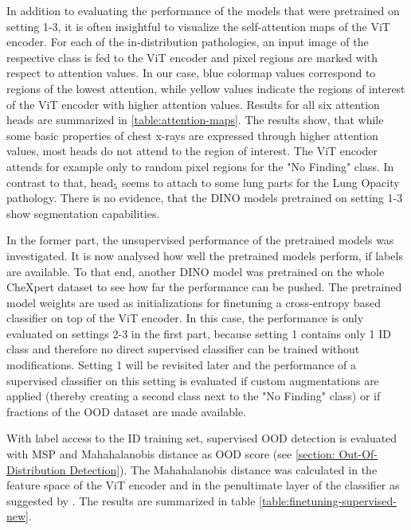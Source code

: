 \par
In addition to evaluating the performance of the models that were pretrained on setting 1-3, it is often insightful to visualize the self-attention maps of the ViT encoder.
For each of the in-distribution pathologies, an input image of the respective class is fed to the ViT encoder and pixel regions are marked with respect to attention values.
In our case, blue colormap values correspond to regions of the lowest attention, while yellow values indicate the regions of interest of the ViT encoder with higher attention values.
Results for all six attention heads are summarized in \ref{table:attention-maps}.
The results show, that while some basic properties of chest x-rays are expressed through higher attention values, most heads do not attend to the region of interest.
The ViT encoder attends for example only to random pixel regions for the "No Finding" class.
In contrast to that, $\text{head}_5$ seems to attach to some lung parts for the Lung Opacity pathology.
There is no evidence, that the DINO models pretrained on setting 1-3 show segmentation capabilities.
\par
In the former part, the unsupervised performance of the pretrained models was investigated.
It is now analysed how well the pretrained models perform, if labels are available.
To that end, another DINO model was pretrained on the whole CheXpert dataset to see how far the performance can be pushed.
The pretrained model weights are used as initializations for finetuning a cross-entropy based classifier on top of the ViT encoder.
In this case, the performance is only evaluated on settings 2-3 in the first part, because setting 1 contains only 1 ID class and therefore no direct supervised classifier can be trained without modifications.
Setting 1 will be revisited later and the performance of a supervised classifier on this setting is evaluated if custom augmentations are applied (thereby creating a second class next to the "No Finding" class) or if fractions of the OOD dataset are made available.
\par
With label access to the ID training set, supervised OOD detection is evaluated with MSP and Mahahalanobis distance as OOD score (see \ref{section: Out-Of-Distribution Detection}).
The Mahahalanobis distance was calculated in the feature space of the ViT encoder and in the penultimate layer of the classifier as suggested by \citep{Lee2018}.
The results are summarized in table \ref{table:finetuning-supervised-new}.
